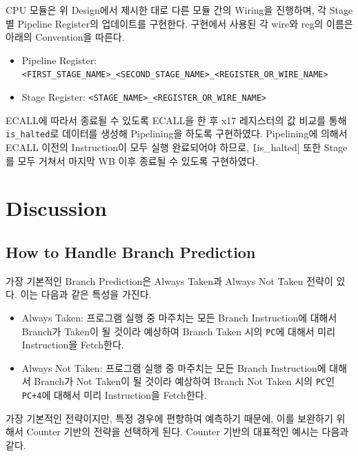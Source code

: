 \documentclass[openright, a4paper]{article}
\newcommand{\code}[1]{\texttt{#1}}
\begin{document}
CPU 모듈은 위 Design에서 제시한 대로 다른 모듈 간의 Wiring을 진행하며, 각 Stage별 Pipeline Register의 업데이트를 구현한다. 구현에서 사용된 각 wire와 reg의 이름은 아래의 Convention을 따른다.

\begin{itemize}
    \item Pipeline Register: \code{<FIRST_STAGE_NAME>_<SECOND_STAGE_NAME>_<REGISTER_OR_WIRE_NAME>}
    \item Stage Register: \code{<STAGE_NAME>_<REGISTER_OR_WIRE_NAME>}
\end{itemize}

ECALL에 따라서 종료될 수 있도록 ECALL을 한 후 x17 레지스터의 값 비교를 통해 \code{is_halted}로 데이터를 생성해 Pipelining을 하도록 구현하였다. Pipelining에 의해서 ECALL 이전의 Instruction이 모두 실행 완료되어야 하므로, \code[is_halted] 또한 Stage를 모두 거쳐서 마지막 WB 이후 종료될 수 있도록 구현하였다.


\section{Discussion}

\subsection{How to Handle Branch Prediction}

가장 기본적인 Branch Prediction은 Always Taken과 Always Not Taken 전략이 있다. 이는 다음과 같은 특성을 가진다.

\begin{itemize}
    \item Always Taken: 프로그램 실행 중 마주치는 모든 Branch Instruction에 대해서 Branch가 Taken이 될 것이라 예상하여 Branch Taken 시의 \code{PC}에 대해서 미리 Instruction을 Fetch한다.
    \item Always Not Taken: 프로그램 실행 중 마주치는 모든 Branch Instruction에 대해서 Branch가 Not Taken이 될 것이라 예상하여 Branch Not Taken 시의 \code{PC}인 \code{PC+4}에 대해서 미리 Instruction을 Fetch한다.
\end{itemize}

가장 기본적인 전략이지만, 특정 경우에 편향하여 예측하기 때문에, 이를 보완하기 위해서 Counter 기반의 전략을 선택하게 된다. Counter 기반의 대표적인 예시는 다음과 같다.
\end{document}
